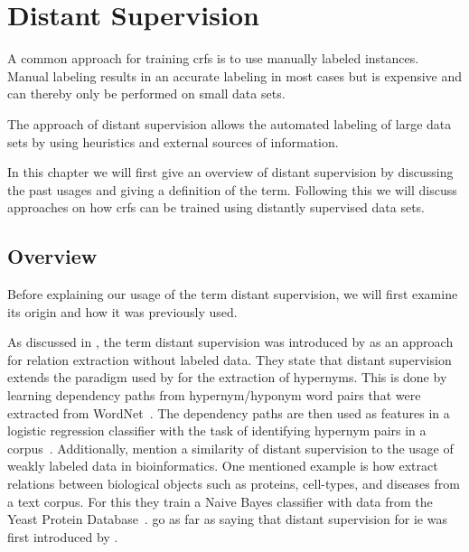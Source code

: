 \chapter{Distant Supervision}\label{cha:distant-supervision}

A common approach for training \glspl{crf} is to use manually labeled instances.
Manual labeling results in an accurate labeling in most cases but is expensive and can thereby only be performed on small data sets.


The approach of \gls{distant supervision} allows the automated labeling of large data sets by using heuristics and external sources of information.

In this chapter we will first give an overview of \gls{distant supervision} by discussing the past usages and giving a definition of the term.
Following this we will discuss approaches on how \glspl{crf} can be trained using distantly supervised data sets.



\section{Overview}

Before explaining our usage of the term \gls{distant supervision}, we will first examine its origin and how it was previously used.

\bigskip

As discussed in , the term \gls{distant supervision} was introduced by \citet{mintz2009distant} as an approach for relation extraction without labeled data.
They state that \gls{distant supervision} extends the paradigm used by \citet{snow2005learning} for the extraction of hypernyms.
This is done by learning dependency paths from hypernym/hyponym word pairs that were extracted from WordNet~\citep{snow2005learning}.
The dependency paths are then used as features in a logistic regression classifier with the task of identifying hypernym pairs in a corpus~\citep{snow2005learning}.
Additionally, \citet{mintz2009distant} mention a similarity of \gls{distant supervision} to the usage of weakly labeled data in bioinformatics.
One mentioned example is how \citet{craven1999constructing} extract relations between biological objects such as proteins, cell-types, and diseases from a text corpus.
For this they train a Naive Bayes classifier with data from the Yeast Protein Database~\citep{payne1997yeast}.
\citet{surdeanu2012multi} go as far as saying that distant supervision for \gls{ie} was first introduced by \citet{craven1999constructing}.

